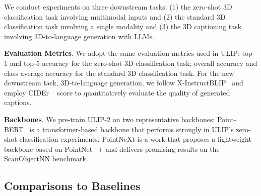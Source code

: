 \documentclass[10pt,twocolumn,letterpaper]{article}
\begin{document}
We conduct experiments on three downstream tasks: (1) the zero-shot 3D classification task involving multimodal inputs and (2) the standard 3D classification task involving a single modality and (3) the 3D captioning task involving 3D-to-language generation with LLMs.

\noindent\textbf{Evaluation Metrics}. We adopt the same evaluation metrics used in ULIP: top-1 and top-5 accuracy for the zero-shot 3D classification task; overall accuracy and class average accuracy for the standard 3D classification task. For the new downstream task, 3D-to-language generation, we follow X-InstructBLIP~\citep{xinstructblip} and employ CIDEr ~\citep{vedantam2015cider} score to quantitatively evaluate the quality of generated captions.

\noindent\textbf{Backbones}. We pre-train ULIP-2 on two representative backbones: Point-BERT~\citep{yu2022point} is a transformer-based backbone that performs strongly in ULIP's zero-shot classification experiments. PointNeXt \cite{qian2022pointnext} is a work that proposes a lightweight backbone based on PointNet++ \cite{qi2017pointnet++} and delivers promising results on the ScanObjectNN benchmark.

\subsection{Comparisons to Baselines}
\end{document}
